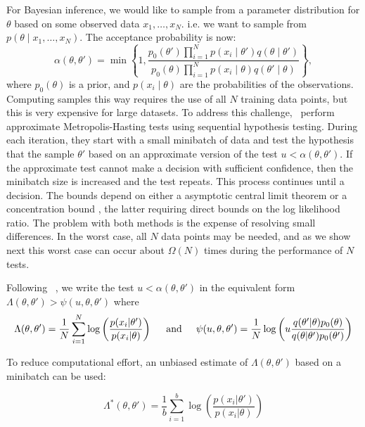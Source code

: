 \documentclass{article}
\begin{document}
For Bayesian inference, we would like to sample from a parameter distribution for $\theta$ based on some
observed data $x_1,\ldots,x_N$. i.e. we want to sample from 
$p(\theta \mid x_1, \ldots, x_N)$. The acceptance probability is now:
\begin{equation}
\alpha(\theta,\theta') = 
\min\left\{ 1, \frac{p_0(\theta')\prod_{i=1}^N p(x_i \mid \theta')q(\theta \mid
\theta')}{p_0(\theta)\prod_{i=1}^N p(x_i \mid \theta)q(\theta' \mid\theta)} \right\},
\end{equation}
where $p_0(\theta)$ is a prior, and $p(x_i \mid \theta)$ are the
probabilities of the observations. Computing samples this way requires
the use of all $N$ training data points, but this is very expensive
for large datasets. To address this challenge,~\cite{cutting_mh_2014,icml2014c1_bardenet14} perform
approximate Metropolis-Hasting tests using sequential hypothesis
testing. During each iteration, they start with a small minibatch of
data and test the hypothesis that the sample $\theta'$ based on an
approximate version of the test $u < \alpha(\theta,\theta')$. If the
approximate test cannot make a decision with sufficient confidence,
then the minibatch size is increased and the test repeats. This
process continues until a decision. The bounds depend on either a
asymptotic central limit theorem \cite{cutting_mh_2014} or a
concentration bound \cite{icml2014c1_bardenet14}, the latter requiring
direct bounds on the log likelihood ratio.  The problem with both
methods is the expense of resolving small differences.  In the worst
case, all $N$ data points may be needed, and as we show next this
worst case can occur about $\Omega(N)$ times during the performance of
$N$ tests.

Following ~\cite{icml2014c1_bardenet14}, we write the test $u < \alpha(\theta,\theta')$ in
the equivalent form $\Lambda(\theta,\theta') > \psi(u,\theta,\theta')$ where
\begin{equation}
\Lambda(\theta,\theta') = \frac{1}{N}\sum_{i=1}^N \log\left(\frac{p(x_i|\theta')}{p(x_i|\theta)}\right)  
\hspace{0.2in} {\rm and} \hspace{0.2in}
\psi(u,\theta,\theta') = \frac{1}{N}\log\left(u\frac{q(\theta'|\theta)p_0(\theta)}{q(\theta|\theta')p_0(\theta')}\right)
\end{equation}

To reduce computational effort, an unbiased estimate of $\Lambda(\theta,\theta')$
based on a minibatch can be used:

\begin{equation}
\Lambda^*(\theta,\theta') = \frac{1}{b}\sum_{i=1}^b \log\left(\frac{p(x_i|\theta')}{p(x_i|\theta)}\right)  
\end{equation}
\end{document}
